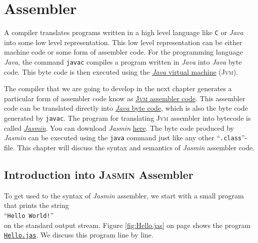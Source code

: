 \chapter{Assembler}
A compiler translates programs written in a high level language like \texttt{C} or
\textsl{Java} into some low level representation.  This low level representation can be
either machine code or some form of assembler code.  For the programming language \textsl{Java},
the command \texttt{javac} compiles a program written in \textsl{Java} into
\textsl{Java} byte code.  This byte code is then executed using the 
\href{http://en.wikipedia.org/wiki/Java_virtual_machine}{\textsl{Java} virtual machine}
(\textsc{Jvm}).

The compiler that we are going to
develop in the next chapter generates a particular form of assembler code know as
\href{http://jasmin.sourceforge.net}{\textsc{Jvm} assembler code}.
This assembler code can be translated directly into
\href{http://en.wikipedia.org/wiki/Java_bytecode}{\textsl{Java} byte code}, which 
is also the byte code generated by \texttt{javac}.  The program for translating \textsc{Jvm}
assembler into bytecode is called \href{http://jasmin.sourceforge.net}{\textsl{Jasmin}}.
You can download \textsl{Jasmin} 
\href{http://sourceforge.net/projects/jasmin/files/latest/download?source=files}{here}.
The  byte code produced by \textsl{Jasmin} can be executed using the
\texttt{java} command just like any other ``\texttt{.class}''-file.  
This chapter will discuss the syntax and
semantics of \textsl{Jasmin} assembler code.



\section{Introduction into \textsc{Jasmin} Assembler}
To get used to the syntax of \textsl{Jasmin} assembler, we start with a small program that prints the
string 
\\[0.2cm]
\hspace*{1.3cm}
``\texttt{Hello World!}'' 
\\[0.2cm]
on the standard output stream.  Figure \ref{fig:Hello.jas} on page
\pageref{fig:Hello.jas} shows the program
\href{https://github.com/karlstroetmann/Formal-Languages/tree/master/Jasmin/Hello.jas}{\texttt{Hello.jas}}. 
We discuss this program line by line.

